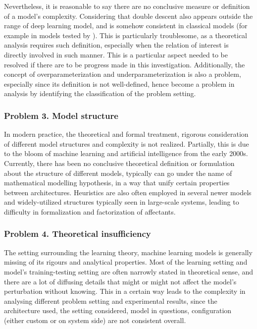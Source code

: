 \documentclass[10pt]{article} %
\begin{document}
Nevertheless, it is reasonable to say there are no conclusive measure or definition of a model's complexity. Considering that double descent also appears outside the range of deep learning model, and is somehow consistent in classical models (for example in models tested by \cite{belkin_reconciling_2019}). This is particularly troublesome, as a theoretical analysis requires such definition, especially when the relation of interest is directly involved in such manner. This is a particular aspect needed to be resolved if there are to be progress made in this investigation. Additionally, the concept of overparameterization and underparameterization is also a problem, especially since its definition is not well-defined, hence become a problem in analysis by identifying the classification of the problem setting. 
\subsubsection*{Problem 3. Model structure}

In modern practice, the theoretical and formal treatment, rigorous consideration of different model structures and complexity is not realized. Partially, this is due to the bloom of machine learning and artificial intelligence from the early 2000s. Currently, there has been no conclusive theoretical definition or formulation about the structure of different models, typically can go under the name of mathematical modelling hypothesis, in a way that unify certain properties between architectures. Heuristics are also often employed in several newer models and widely-utilized structures typically seen in large-scale systems, leading to difficulty in formalization and factorization of affectants. 

\subsubsection*{Problem 4. Theoretical insufficiency}

The setting surrounding the learning theory, machine learning models is generally missing of its rigours and analytical properties. Most of the learning setting and model's training-testing setting are often narrowly stated in theoretical sense, and there are a lot of diffusing details that might or might not affect the model's perturbation without knowing. This in a certain way leads to the complexity in analysing different problem setting and experimental results, since the architecture used, the setting considered, model in questions, configuration (either custom or on system side) are not consistent overall. 
\end{document}
